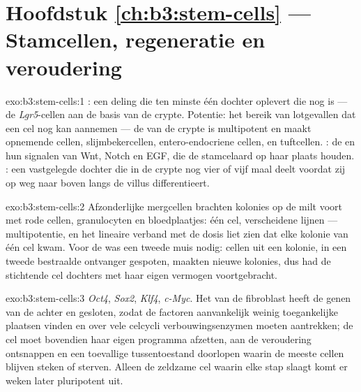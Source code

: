 \section*{Hoofdstuk \ref{ch:b3:stem-cells} --- Stamcellen, regeneratie en veroudering}

\begin{solution}{exo:b3:stem-cells:1}
: een deling die ten minste één dochter oplevert die nog
 is --- de \emph{Lgr5}-cellen aan de basis van de crypte.
Potentie: het bereik van lotgevallen dat een cel nog kan aannemen --- de
 van de crypte is multipotent en maakt opnemende cellen,
slijmbekercellen, entero-endocriene cellen,  en tuftcellen.
: de  en hun signalen van Wnt, Notch en EGF, die de
stamcelaard op haar plaats houden. : een
vastgelegde dochter die in de crypte nog vier of vijf maal deelt voordat
zij op weg naar boven langs de villus differentieert.
\end{solution}

\begin{solution}{exo:b3:stem-cells:2}
Afzonderlijke mergcellen brachten kolonies op de milt voort met rode
cellen, granulocyten en bloedplaatjes: één cel, verscheidene lijnen ---
multipotentie, en het lineaire verband met de dosis liet zien dat elke
kolonie van één cel kwam. Voor de  was een tweede muis
nodig: cellen uit een kolonie, in een tweede bestraalde ontvanger
gespoten, maakten nieuwe kolonies, dus had de stichtende cel dochters
met haar eigen vermogen voortgebracht.
\end{solution}

\begin{solution}{exo:b3:stem-cells:3}
\emph{Oct4}, \emph{Sox2}, \emph{Klf4}, \emph{c-Myc}. Het  van
de fibroblast heeft de genen van de  achter 
en  gesloten, zodat de factoren aanvankelijk weinig
toegankelijke plaatsen vinden en over vele celcycli
verbouwingsenzymen moeten aantrekken; de cel moet bovendien haar eigen
programma afzetten, aan de veroudering ontsnappen en een toevallige
tussentoestand doorlopen waarin de meeste cellen blijven steken of
sterven. Alleen de zeldzame cel waarin elke stap slaagt komt er weken
later pluripotent uit.
\end{solution}

